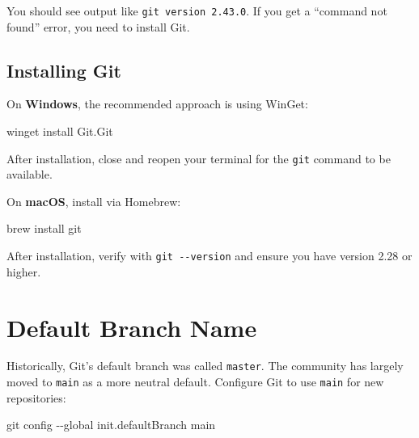 \documentclass[
  letterpaper,
  DIV=11,
  numbers=noendperiod]{scrreprt}
\newenvironment{Shaded}{\begin{snugshade}}{\end{snugshade}}
\newcommand{\AttributeTok}[1]{\textcolor[rgb]{0.40,0.45,0.13}{#1}}
\newcommand{\ExtensionTok}[1]{\textcolor[rgb]{0.00,0.23,0.31}{#1}}
\newcommand{\FunctionTok}[1]{\textcolor[rgb]{0.28,0.35,0.67}{#1}}
\newcommand{\NormalTok}[1]{\textcolor[rgb]{0.00,0.23,0.31}{#1}}
\newcommand{\OperatorTok}[1]{\textcolor[rgb]{0.37,0.37,0.37}{#1}}
\begin{document}
You should see output like \texttt{git\ version\ 2.43.0}. If you get a
``command not found'' error, you need to install Git.

\subsection{Installing Git}\label{installing-git}

On \textbf{Windows}, the recommended approach is using WinGet:

\begin{codelisting}

\caption{\texttt{terminal}}

\begin{Shaded}
\begin{Highlighting}[]
\NormalTok{winget install Git}\OperatorTok{.}\FunctionTok{Git}
\end{Highlighting}
\end{Shaded}

\end{codelisting}

After installation, close and reopen your terminal for the \texttt{git}
command to be available.

On \textbf{macOS}, install via Homebrew:

\begin{codelisting}

\caption{\texttt{terminal}}

\begin{Shaded}
\begin{Highlighting}[]
\ExtensionTok{brew}\NormalTok{ install git}
\end{Highlighting}
\end{Shaded}

\end{codelisting}

After installation, verify with \texttt{git\ -\/-version} and ensure you
have version 2.28 or higher.

\section{Default Branch Name}\label{default-branch-name}

Historically, Git's default branch was called \texttt{master}. The
community has largely moved to \texttt{main} as a more neutral default.
Configure Git to use \texttt{main} for new repositories:

\begin{codelisting}

\caption{\texttt{terminal}}

\begin{Shaded}
\begin{Highlighting}[]
\FunctionTok{git}\NormalTok{ config }\AttributeTok{{-}{-}global}\NormalTok{ init.defaultBranch main}
\end{Highlighting}
\end{Shaded}

\end{codelisting}
\end{document}
